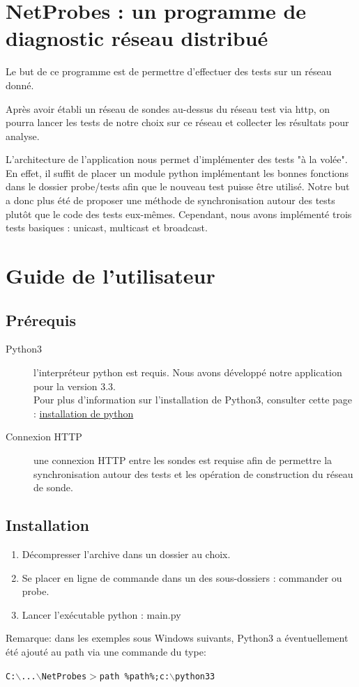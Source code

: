 \documentclass[a4paper,11pt]{article}
\begin{document}


\tableofcontents

\section{NetProbes : un programme de diagnostic réseau distribué}
Le but de ce programme est de permettre d'effectuer des tests sur un réseau donné.

Après avoir établi un réseau de sondes au-dessus du réseau test via http, on pourra lancer les tests de notre choix sur ce réseau et collecter les résultats pour analyse.

L'architecture de l'application nous permet d'implémenter des tests "à la volée". En effet, il suffit de placer un module python implémentant les bonnes fonctions dans le dossier probe/tests afin que le nouveau test puisse être utilisé. Notre but a donc plus été de proposer une méthode de synchronisation autour des tests plutôt que le code des tests eux-mêmes. Cependant, nous avons implémenté trois tests basiques : unicast, multicast et broadcast.

\section{Guide de l'utilisateur}

\subsection{Prérequis}
\begin{description}
\item[Python3] l'interpréteur python est requis. Nous avons développé notre application pour la version 3.3.\\
Pour plus d'information sur l'installation de Python3, consulter cette page : \href{http://www.python.org/download/releases/3.3.2/}{installation de python}
\item[Connexion HTTP] une connexion HTTP entre les sondes est requise afin de permettre la synchronisation autour des tests et les opération de construction du réseau de sonde.
\end{description}

\subsection{Installation}
\begin{enumerate}
\item Décompresser l'archive dans un dossier au choix.
\item Se placer en ligne de commande dans un des sous-dossiers : commander ou probe.
\item Lancer l'exécutable python : main.py
\end{enumerate}
Remarque: dans les exemples sous Windows suivants, Python3 a éventuellement été ajouté au path via une commande du type:
\begin{center} \texttt{{\color{blue}C:$\backslash$...$\backslash$NetProbes$>$}path \%path\%;c:$\backslash$python33} \end{center}
\end{document}
